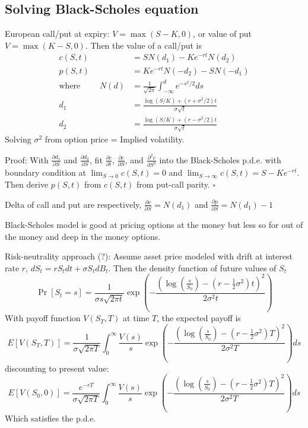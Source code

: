 \documentclass[9pt,twocolumn]{extarticle}
\begin{document}
\subsection*{Solving Black-Scholes equation}

European call/put at expiry: $V = \max(S-K,0)$, or value of put $V=\max(K-S, 0)$.
Then the value of a call/put is
\begin{align*}
c(S,t) &= SN(d_1) - Ke^{-rt}N(d_2) \\
p(S,t) &= Ke^{-rt}N(-d_2) - SN(-d_1) \\
\text{where }\qquad
N(d) &= \frac{1}{\sqrt{2\pi}}\int_{-\infty}^d e^{-s^2/2} ds \\
d_1 &= \frac{\log(S/K)+(r+\sigma^2/2)t}{\sigma\sqrt{t}} \\
d_2 &= \frac{\log(S/K)+(r-\sigma^2/2)t}{\sigma\sqrt{t}}
\end{align*}
Solving $\sigma^2$ from option price = Implied volatility.

Proof: With $\frac{\partial d_1}{\partial S}$ and $\frac{\partial d_2}{\partial
S}$, fit $\frac{\partial c}{\partial t}$, $\frac{\partial c}{\partial S}$, and
$\frac{\partial^2 c}{\partial S^2}$ into the Black-Scholes p.d.e. with boundary
condition at $\lim_{S\to 0} c(S,t) = 0$ and
$\lim_{S\to\infty} c(S,t) = S - Ke^{-rt}$. Then derive $p(S,t)$ from $c(S,t)$
from put-call parity. $\square$

Delta of call and put are respectively, $\frac{\partial c}{\partial S} = N(d_1)$
and $\frac{\partial p}{\partial S} = N(d_1) - 1$

Black-Scholes model is good at pricing options at the money but less so for out
of the money and deep in the money options.

Risk-neutrality approach (?): Assume asset price modeled with drift at interest rate $r$,
$dS_t = rS_t dt + \sigma S_t dB_t$. Then the density function of future values of $S_t$
$$ \Pr[S_t = s] = \frac{1}{\sigma s \sqrt{2\pi t}} \exp\left(-\frac{\left(\log(\frac{s}{S_0}) - (r-\frac{1}{2}\sigma^2)t\right)^2}{2\sigma^2t}\right)$$
With payoff function $V(S_T,T)$ at time $T$, the expected payoff is
$$ E[V(S_T,T)] = \frac{1}{\sigma \sqrt{2\pi T}} \int_0^{\infty} \frac{V(s)}{s} \exp\left(-\frac{\left(\log(\frac{s}{S_0}) - (r-\frac{1}{2}\sigma^2)T\right)^2}{2\sigma^2T}\right) ds $$
discounting to present value:
$$ E[V(S_0,0)] = \frac{e^{-rT}}{\sigma \sqrt{2\pi T}} \int_0^{\infty} \frac{V(s)}{s} \exp\left(-\frac{\left(\log(\frac{s}{S_0}) - (r-\frac{1}{2}\sigma^2)T\right)^2}{2\sigma^2T}\right) ds $$
Which satisfies the p.d.e.
\end{document}
